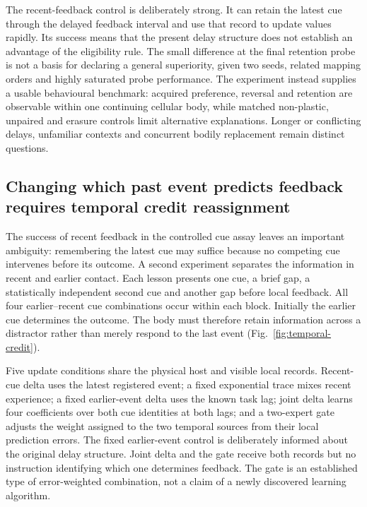 The recent-feedback control is deliberately strong. It can retain the latest cue through the delayed feedback interval and use that record to update values rapidly. Its success means that the present delay structure does not establish an advantage of the eligibility rule. The small difference at the final retention probe is not a basis for declaring a general superiority, given two seeds, related mapping orders and highly saturated probe performance. The experiment instead supplies a usable behavioural benchmark: acquired preference, reversal and retention are observable within one continuing cellular body, while matched non-plastic, unpaired and erasure controls limit alternative explanations. Longer or conflicting delays, unfamiliar contexts and concurrent bodily replacement remain distinct questions.

\subsection*{Changing which past event predicts feedback requires temporal credit reassignment}

The success of recent feedback in the controlled cue assay leaves an important ambiguity: remembering the latest cue may suffice because no competing cue intervenes before its outcome. A second experiment separates the information in recent and earlier contact. Each lesson presents one cue, a brief gap, a statistically independent second cue and another gap before local feedback. All four earlier--recent cue combinations occur within each block. Initially the earlier cue determines the outcome. The body must therefore retain information across a distractor rather than merely respond to the last event (Fig.~\ref{fig:temporal-credit}).

Five update conditions share the physical host and visible local records. Recent-cue delta uses the latest registered event; a fixed exponential trace mixes recent experience; a fixed earlier-event delta uses the known task lag; joint delta learns four coefficients over both cue identities at both lags; and a two-expert gate adjusts the weight assigned to the two temporal sources from their local prediction errors. The fixed earlier-event control is deliberately informed about the original delay structure. Joint delta and the gate receive both records but no instruction identifying which one determines feedback. The gate is an established type of error-weighted combination, not a claim of a newly discovered learning algorithm.

